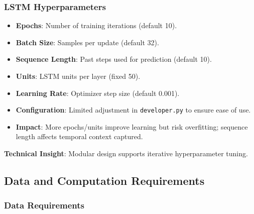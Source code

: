 \subsubsection{LSTM Hyperparameters}

\begin{itemize}
	\item \textbf{Epochs}: Number of training iterations (default 10).
	\item \textbf{Batch Size}: Samples per update (default 32).
	\item \textbf{Sequence Length}: Past steps used for prediction (default 10).
	\item \textbf{Units}: LSTM units per layer (fixed 50).
	\item \textbf{Learning Rate}: Optimizer step size (default 0.001).
	\item \textbf{Configuration}: Limited adjustment in \texttt{developer.py} to ensure ease of use.
	\item \textbf{Impact}: More epochs/units improve learning but risk overfitting; sequence length affects temporal context captured.
\end{itemize}

\textbf{Technical Insight}: Modular design supports iterative hyperparameter tuning.

\subsection{Data and Computation Requirements}

\subsubsection{Data Requirements}

